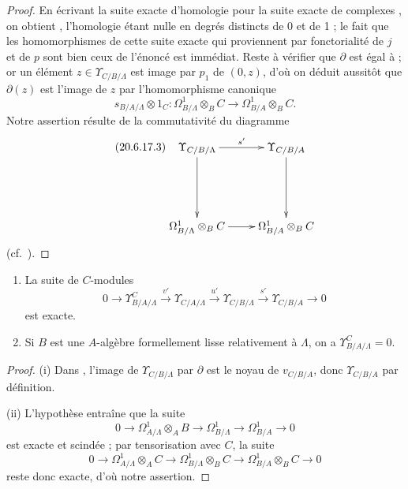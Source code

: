 \begin{proof}
En écrivant la suite exacte d'homologie pour la suite exacte de complexes
, on obtient , l'homologie étant
nulle en degrés distincts de 0 et de 1 ; le fait que les homomorphismes de
cette suite exacte qui proviennent par fonctorialité de $j$ et de $p$ sont
bien ceux de l'énoncé est immédiat. Reste à vérifier que $\partial$ est égal
à  ; or un élément $z\in\Upsilon_{C/B/\Lambda}$ est
image par $p_1$ de $(0,z)$, d'où on déduit aussitôt que $\partial(z)$ est
l'image de $z$ par l'homomorphisme canonique
\[
  s_{B/A/\Lambda}\otimes1_C:
  \Omega^1_{B/\Lambda}\otimes_B C\to\Omega^1_{B/A}\otimes_B C.
\]
Notre assertion résulte de la commutativité du diagramme
\begin{equation}
\tag{20.6.17.3}
\label{0.20.6.17.3-fr}
\xymatrix{
  \Upsilon_{C/B/\Lambda} \ar[r]^{s'} \ar[dd] & \Upsilon_{C/B/A} \ar[dd] \\
  & \\
  \Omega^1_{B/\Lambda}\otimes_B C \ar[r] &
  \Omega^1_{B/A}\otimes_B C
}
\end{equation}
(cf.\ ).
\end{proof}

\begin{corollary}[20.6.18]
\label{0.20.6.18-fr}
\begin{enumerate}
  \item[\rm(i)] La suite de $C$-modules
\begin{equation}
\tag{20.6.18.1}
\label{0.20.6.18.1-fr}
  0\to\Upsilon^C_{B/A/\Lambda}\xrightarrow{v'}
  \Upsilon_{C/A/\Lambda}\xrightarrow{u'}
  \Upsilon_{C/B/\Lambda}\xrightarrow{s'}\Upsilon_{C/B/A}\to0
\end{equation}
est exacte.
  \item[\rm(ii)] Si $B$ est une $A$-algèbre formellement lisse relativement
  à $\Lambda$, on a $\Upsilon^C_{B/A/\Lambda}=0$.
\end{enumerate}
\end{corollary}

\begin{proof}
(i) Dans , l'image de $\Upsilon_{C/B/\Lambda}$ par
$\partial$ est le noyau de $v_{C/B/A}$, donc $\Upsilon_{C/B/A}$ par
définition.

(ii) L'hypothèse entraîne que la suite
\[
  0\to\Omega^1_{A/\Lambda}\otimes_A B\to
  \Omega^1_{B/\Lambda}\to\Omega^1_{B/A}\to0
\]
est exacte et scindée  ; par tensorisation avec $C$, la
suite
\[
  0\to\Omega^1_{A/\Lambda}\otimes_A C\to
  \Omega^1_{B/\Lambda}\otimes_B C\to
  \Omega^1_{B/A}\otimes_B C\to0
\]
reste donc exacte, d'où notre assertion.
\end{proof}


